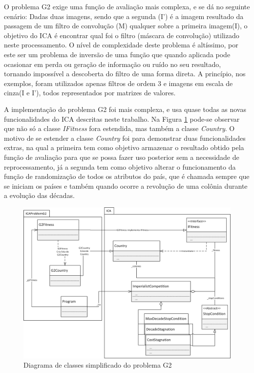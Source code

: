 O problema G2 exige uma função de avaliação mais complexa, e se dá no seguinte cenário: Dadas duas imagens, sendo que a segunda (I') é a imagem resultado da passagem de um filtro de convolução (M) qualquer sobre a primeira imagem(I), o objetivo do ICA é encontrar qual foi o filtro (máscara de convolução) utilizado neste processamento. O nível de complexidade deste problema é altíssimo, por este ser um problema de inversão de uma função que quando aplicada pode ocasionar em perda ou geração de informação ou ruído no seu resultado, tornando impossível a descoberta do filtro de uma forma direta. A princípio, nos exemplos, foram utilizados apenas filtros de ordem 3 e imagens em escala de cinza(I e I'), todos representados por matrizes de valores.

A implementação do problema G2 foi mais complexa, e usa quase todas as novas funcionalidades do ICA descritas neste trabalho. Na Figura \ref{fig:Problems-G2Model} pode-se observar que não só a classe \emph{IFitness} fora estendida, mas também a classe \emph{Country}. O motivo de se estender a classe \emph{Country} foi para demonstrar duas funcionalidades extras, na qual a primeira tem como objetivo armazenar o resultado obtido pela função de avaliação para que se possa fazer uso posterior sem a necessidade de reprocessamento, já a segunda tem como objetivo alterar o funcionamento da função de randomização de todos os atributos do país, que é chamada sempre que se iniciam os países e também quando ocorre a revolução de uma colônia durante a evolução das décadas. 

\begin{figure}[h]
	\centering
	\includegraphics[scale=0.5]{Figuras/Problems-G2Model.png}
	\caption{Diagrama de classes simplificado do problema G2 }
	\label{fig:Problems-G2Model}
\end{figure}

